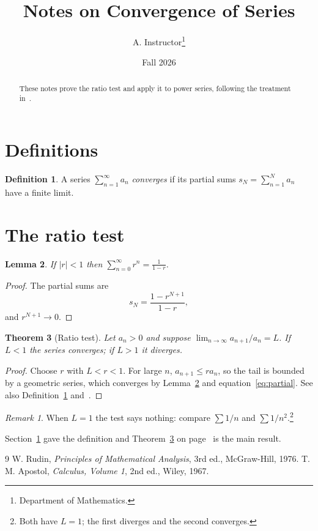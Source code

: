 \documentclass[11pt]{article}
\title{Notes on Convergence of Series}
\author{A. Instructor\thanks{Department of Mathematics.}}
\date{Fall 2026}
\newtheorem{theorem}{Theorem}[section]
\newtheorem{lemma}[theorem]{Lemma}
\theoremstyle{definition}
\newtheorem{definition}[theorem]{Definition}
\theoremstyle{remark}
\newtheorem*{remark}{Remark}
\begin{document}
\maketitle

\begin{abstract}
These notes prove the ratio test and apply it to power series, following the treatment in~\cite{rudin}.
\end{abstract}

\section{Definitions}\label{sec:defs}
\begin{definition}\label{def:conv}
A series $\sum_{n=1}^\infty a_n$ \emph{converges} if its partial sums $s_N = \sum_{n=1}^N a_n$ have a finite limit.
\end{definition}

\section{The ratio test}\label{sec:ratio}
\begin{lemma}\label{lem:geom}
If $|r| < 1$ then $\sum_{n=0}^\infty r^n = \frac{1}{1-r}$.
\end{lemma}
\begin{proof}
The partial sums are
\begin{equation}\label{eq:partial}
 s_N = \frac{1 - r^{N+1}}{1 - r},
\end{equation}
and $r^{N+1} \to 0$.
\end{proof}

\begin{theorem}[Ratio test]\label{thm:ratio}
Let $a_n > 0$ and suppose $\lim_{n\to\infty} a_{n+1}/a_n = L$. If $L < 1$ the series converges; if $L > 1$ it diverges.
\end{theorem}
\begin{proof}
Choose $r$ with $L < r < 1$. For large $n$, $a_{n+1} \le r a_n$, so the tail is bounded by a geometric series, which converges by Lemma~\ref{lem:geom} and equation~\eqref{eq:partial}. See also Definition~\ref{def:conv} and~\cite[Ch.~3]{rudin, apostol}.
\end{proof}

\begin{remark}
When $L = 1$ the test says nothing: compare $\sum 1/n$ and $\sum 1/n^2$.\footnote{Both have $L = 1$; the first diverges and the second converges.}
\end{remark}

Section~\ref{sec:defs} gave the definition and Theorem~\ref{thm:ratio} on page~\pageref{thm:ratio} is the main result.

\begin{thebibliography}{9}
 W. Rudin, \emph{Principles of Mathematical Analysis}, 3rd ed., McGraw-Hill, 1976.
 T. M. Apostol, \emph{Calculus, Volume 1}, 2nd ed., Wiley, 1967.
\end{thebibliography}
\end{document}
